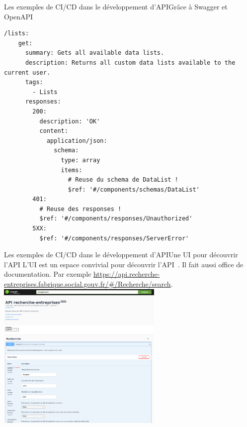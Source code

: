 \documentclass{beamer}
\begin{document}
    \begin{frame}[fragile]{Les exemples de CI/CD dans le développement d'API}{Grâce à Swagger et OpenAPI}
        \transdissolve
        \begin{lstlisting}
/lists:
    get:
      summary: Gets all available data lists.
      description: Returns all custom data lists available to the current user.
      tags:
        - Lists
      responses:
        200:
          description: 'OK'
          content:
            application/json:
              schema:
                type: array
                items:
                  # Reuse du schema de DataList !
                  $ref: '#/components/schemas/DataList'
        401:
          # Reuse des responses !
          $ref: '#/components/responses/Unauthorized'
        5XX:
          $ref: '#/components/responses/ServerError'
        \end{lstlisting}
    \end{frame}

    \begin{frame}{Les exemples de CI/CD dans le développement d'API}{Une UI pour découvrir l'API}
        \transdissolve
        L'UI est un espace convivial pour découvrir l'API~.
        Il fait aussi office de documentation.
        Par exemple \url{https://api.recherche-entreprises.fabrique.social.gouv.fr/\#/Recherche/search}.
        \bigbreak
        \centering
        \includegraphics[width=8cm]{image/swagger-ui}
    \end{frame}
\end{document}
